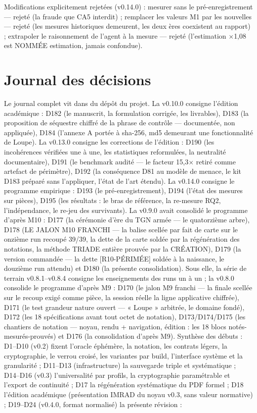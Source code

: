 Modifications explicitement rejetées (v0.14.0) : mesurer sans le
pré-enregistrement — rejeté (la fraude que CA5 interdit) ; remplacer les
valeurs M1 par les nouvelles — rejeté (les mesures historiques demeurent,
les deux ères coexistent au rapport) ; extrapoler le raisonnement de
l'agent à la mesure — rejeté (l'estimation $\times$1,08 est NOMMÉE
estimation, jamais confondue).

\section{Journal des décisions}\label{sec:decisions}

Le journal complet vit dans  du dépôt du projet. La
v0.10.0 consigne l'édition académique : D182 (le manuscrit, la formulation
corrigée, les livrables), D183 (la proposition de séquestre chiffré de la
phrase de contrôle — documentée, non appliquée), D184 (l'annexe A portée à
sha-256, md5 demeurant une fonctionnalité de Loupe). La v0.13.0 consigne
les corrections de l'édition : D190 (les incohérences vérifiées une à une,
les statistiques reformulées, la neutralité documentaire), D191 (le
benchmark audité — le facteur 15,3× retiré comme artefact de périmètre),
D192 (la conséquence D81 au modèle de menace, le kit D183 préparé sans
l'appliquer, l'état de l'art étendu). La v0.14.0 consigne le programme
empirique : D193 (le pré-enregistrement), D194 (l'état des mesures sur
pièces), D195 (les résultats : le bras de référence, la re-mesure RQ2,
l'indépendance, le re-jeu des survivants). La v0.9.0 avait
consolidé le programme d'après M10 : D177 (la cérémonie d'ère du TGN
armée — le quatorzième arbre), D178 (LE JALON M10 FRANCHI — la balise
 scellée par fait de carte sur le onzième run recoupé 39/39,
la dette de la carte soldée par la régénération des notations, la méthode TRIADE
entière prouvée par la CRÉATION), D179 (la version  commandée
— la dette [R10-PÉRIMÉE] soldée à la naissance, le douzième run attendu) et
D180 (la présente consolidation). Sous elle, la série de terrain v0.8.1–v0.8.4
consigne les enseignements des runs un à un ; la v0.8.0 consolide le programme
d'après M9 : D170 (le jalon M9 franchi — la finale  scellée sur le
recoup exigé comme pièce, la session réelle la ligne applicative chiffrée),
D171 (le test grandeur nature ouvert — « Loupe » arbitrée, le domaine
 fondé), D172 (les 18 spécifications avant tout octet de notation),
D173/D174/D175 (les chantiers de notation — noyau, rendu + navigation, édition :
les 18 blocs notés-mesurés-prouvés) et D176 (la consolidation d'après M9).
Synthèse des débuts :
D1–D10 (v0.2) fixent l'oracle éphémère, la notation, les contrats légers, la
cryptographie, le verrou croisé, les variantes par build, l'interface système et la
granularité ; D11–D13 (infrastructure) la sauvegarde triple et systématique ; D14–D16
(v0.3) l'universalité par profils, la cryptographie paramétrable et l'export de
continuité ; D17 la régénération systématique du PDF formel ; D18 l'édition académique
(présentation IMRAD du noyau v0.3, sans valeur normative) ; D19–D24 (v0.4.0, format
normalisé) la présente révision :

